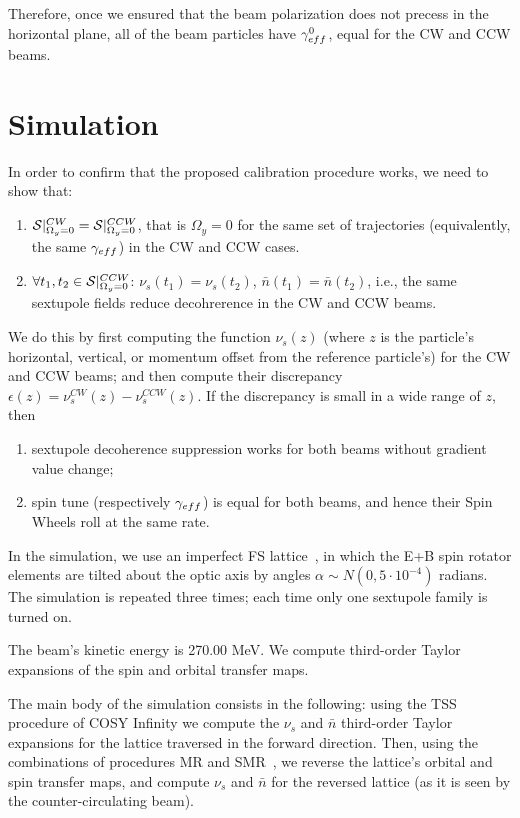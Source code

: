 \documentclass[a4paper]{jacow}
\newcommand{\W}{\Omega}
\newcommand{\nbar}{\bar n}
\begin{document}
Therefore, once we ensured that the beam polarization does not precess in the horizontal plane,
all of the beam particles have $\g*^0$, equal for the CW and CCW beams.

\section{Simulation}
In order to confirm that the proposed calibration procedure works, we need to show that:
\begin{enumerate}
\item $\Stab*^{CW} = \Stab*^{CCW}$, that is $\W_y=0$ for the same set of trajectories (equivalently,
  the same $\g*$) in the CW and CCW cases.
\item $\forall t_1,t_2\in\Stab*^{CCW}$: $\nu_s(t_1) = \nu_s(t_2)$, $\nbar(t_1) = \nbar(t_2)$, i.e., the same
  sextupole fields reduce decohrerence in the CW and CCW beams.
\end{enumerate}

We do this by first computing the function $\nu_s(z)$ (where $z$ is the particle's horizontal, vertical, or
momentum offset from the reference particle's) for the CW and CCW beams; and then compute their discrepancy
$\epsilon(z) = \nu_s^{CW}(z) - \nu_s^{CCW}(z)$. If the discrepancy is small in a wide range of $z$, then
\begin{enumerate}
\item sextupole decoherence suppression works for both beams without gradient value change;
\item spin tune (respectively $\g*$) is equal for both beams, and hence their Spin Wheels roll at the
  same rate.
\end{enumerate}

In the simulation, we use an imperfect FS lattice~\cite{Senichev:Lattices}, in which the E+B
spin rotator elements are tilted about the optic axis by angles $\alpha\sim N(0, 5\cdot 10^{-4})$ radians.
The simulation is repeated three times; each time only one sextupole family is turned on.

The beam's kinetic energy is 270.00 MeV. We compute third-order Taylor expansions of the
spin and orbital transfer maps.

The main body of the simulation consists in the following: using the TSS~\cite[p.~41]{COSYINF:BeamPhysMan}
procedure
of COSY Infinity we compute the $\nu_s$ and $\nbar$ third-order Taylor expansions for the lattice traversed
in the forward direction.
Then, using the combinations of procedures MR and SMR~\cite[p.~233]{Eremey:Thesis}, we reverse
the lattice's orbital and spin transfer maps, and compute $\nu_s$ and $\nbar$
for the reversed lattice (as it is seen by the counter-circulating beam).
\end{document}
